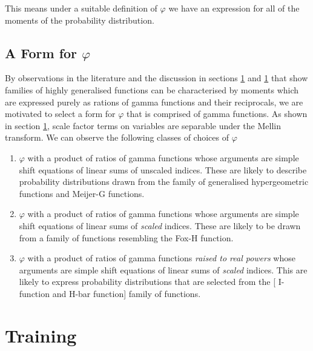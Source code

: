 \documentclass[journal=jcisd8,manuscript=article,layout=onecolumn,pdftex,floatfix,amsmath,amssymb,10pt]{achemso}
\begin{document}
This means under a suitable definition of $\varphi$ we have an expression for all of the moments of the probability distribution.
\subsection{A Form for $\varphi$}
By observations in the literature and the discussion in sections \ref{} and \ref{} that show families of highly generalised functions can be characterised by moments which are expressed purely as rations of gamma functions and their reciprocals, we are motivated to select a form for $\varphi$ that is comprised of gamma functions. As shown in section \ref{}, scale factor terms on variables are separable under the Mellin transform. We can observe the following classes of choices of $\varphi$ \begin{enumerate}
\item $\varphi$ with a product of ratios of gamma functions whose arguments are simple shift equations of linear sums of unscaled indices. These are likely to describe probability distributions drawn from the family of generalised hypergeometric functions and Meijer-G functions.
\item $\varphi$ with a product of ratios of gamma functions whose arguments are simple shift equations of linear sums of \emph{scaled} indices. These are likely to be drawn from a family of functions resembling the Fox-H function.
\item $\varphi$ with a product of ratios of gamma functions \emph{raised to real powers} whose arguments are simple shift equations of linear sums of \emph{scaled} indices. This are likely to express probability distributions that are selected from the [{\color{red} I-function and H-bar function}] family of functions.
\end{enumerate}

\section{Training}
\end{document}
